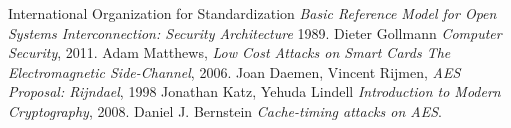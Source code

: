 \documentclass[a4paper,11pt]{article}
\begin{document}
\begin{thebibliography}{1}

   International Organization for Standardization
    {\em Basic Reference Model for Open Systems Interconnection:
    Security Architecture}  1989.
   Dieter Gollmann {\em Computer Security}, 2011.
   Adam Matthews, {\em Low Cost Attacks on Smart Cards
  The Electromagnetic Side-Channel}, 2006.
   Joan Daemen, Vincent Rijmen, {\em AES Proposal: Rijndael}, 1998
   Jonathan Katz, Yehuda Lindell {\em Introduction to Modern Cryptography}, 2008.
   Daniel J. Bernstein {\em Cache-timing attacks on AES}.
\end{thebibliography}
\end{document}
